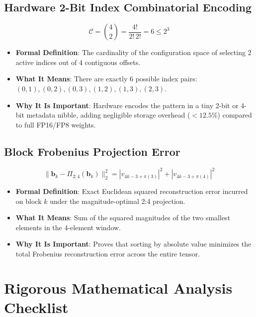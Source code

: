 \documentclass[11pt,a4paper]{article}
\theoremstyle{definition}
\begin{document}
\subsection{Hardware 2-Bit Index Combinatorial Encoding}
{\boldmath
\begin{equation}
\mathcal{C} = \binom{4}{2} = \frac{4!}{2! \, 2!} = 6 \le 2^3
\end{equation}
}
\begin{itemize}
    \item \textbf{Formal Definition}: The cardinality of the configuration space of selecting 2 active indices out of 4 contiguous offsets.
    \item \textbf{What It Means}: There are exactly 6 possible index pairs: $(0,1), (0,2), (0,3), (1,2), (1,3), (2,3)$.
    \item \textbf{Why It Is Important}: Hardware encodes the pattern in a tiny 2-bit or 4-bit metadata nibble, adding negligible storage overhead ($< 12.5\%$) compared to full FP16/FP8 weights.
\end{itemize}

\subsection{Block Frobenius Projection Error}
{\boldmath
\begin{equation}
\|\mathbf{b}_k - \Pi_{2:4}(\mathbf{b}_k)\|_2^2 = |v_{4k-3+\pi(3)}|^2 + |v_{4k-3+\pi(4)}|^2
\end{equation}
}
\begin{itemize}
    \item \textbf{Formal Definition}: Exact Euclidean squared reconstruction error incurred on block $k$ under the magnitude-optimal 2:4 projection.
    \item \textbf{What It Means}: Sum of the squared magnitudes of the two smallest elements in the 4-element window.
    \item \textbf{Why It Is Important}: Proves that sorting by absolute value minimizes the total Frobenius reconstruction error across the entire tensor.
\end{itemize}

\section{Rigorous Mathematical Analysis Checklist}
\end{document}
